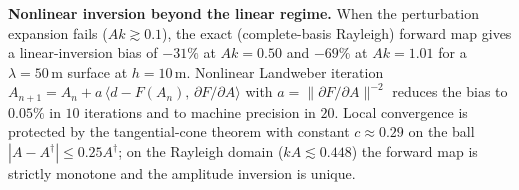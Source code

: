 \documentclass[12pt,a4paper]{article}
\begin{document}
\textbf{Nonlinear inversion beyond the linear regime.}  When the
perturbation expansion fails ($Ak\gtrsim0.1$), the exact
(complete-basis Rayleigh) forward map gives a linear-inversion bias of
$-31\%$ at $Ak=0.50$ and $-69\%$ at $Ak=1.01$ for a
$\lambda=50$\,\textmu m surface at $h=10$\,\textmu m.  Nonlinear
Landweber iteration
$A_{n+1}=A_n+a\,\langle d-F(A_n),\,\partial F/\partial A\rangle$ with
$a=\|\partial F/\partial A\|^{-2}$ reduces the bias to $0.05\%$ in $10$
iterations and to machine precision in $20$.  Local convergence is
protected by the tangential-cone theorem with constant $c\approx0.29$ on
the ball $|A-A^\dagger|\le0.25A^\dagger$; on the Rayleigh domain
($kA\lesssim0.448$) the forward map is strictly monotone and the
amplitude inversion is unique.

\clearpage


\end{document}

